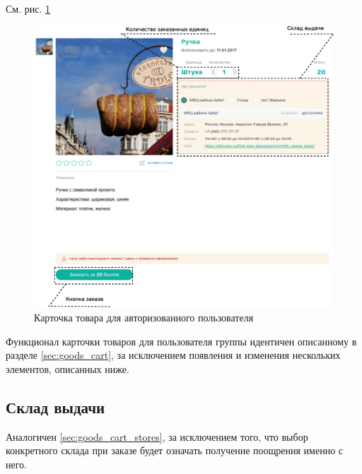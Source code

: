         См. рис. \ref{fig:auth_goods_cart}
            \begin{figure}
                \center
                \includegraphics[width=170mm]{04_auth_funcs/figures/05.eps}
                \caption{Карточка товара для авторизованного пользователя}
                \label{fig:auth_goods_cart}
            \end{figure}
                
 
        Функционал карточки товаров для пользователя группы 
        идентичен описанному в разделе \ref{sec:goods_cart}, за исключением
        появления и изменения нескольких элементов, описанных ниже.
     
        \subsection{Склад выдачи}\label{sec:auth_cart_store}

            Аналогичен \ref{sec:goods_cart_stores}, за исключением того, что 
            выбор конкретного склада при заказе будет означать получение 
            поощрения именно с него.

